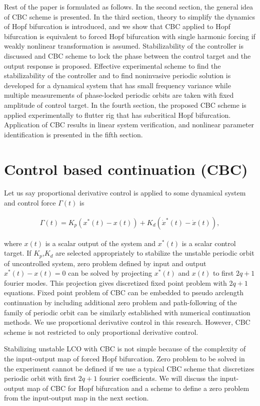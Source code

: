 \documentclass[openacc]{rsproca_new}%
\begin{document}
Rest of the paper is formulated as follows. In the second section, the general idea of CBC scheme is presented. In the third section, theory to simplify the dynamics of Hopf bifurcation is introduced, and we show that CBC applied to Hopf bifurcation is equivalent to forced Hopf bifurcation with single harmonic forcing if weakly nonlinear transformation is assumed. Stabilizability of the controller is discussed and CBC scheme to lock the phase between the control target and the output response is proposed. Effective experimental scheme to find the stabilizability of the controller and to find noninvasive periodic solution is developed for a dynamical system that has small frequency variance while multiple measurements of phase-locked periodic orbits are taken with fixed amplitude of control target. In the fourth section, the proposed CBC scheme is applied experimentally to flutter rig that has subcritical Hopf bifurcation. Application of CBC results in linear system verification, and nonlinear parameter identification is presented in the fifth section.


\section{Control based continuation (CBC)}\label{CBC}
Let us say proportional derivative control is applied to some dynamical system and control force $\Gamma(t)$ is

\begin{align}
\Gamma(t)=K_p(x^*(t)-x(t))+K_d(\dot x^*(t)-\dot x(t)),
\end{align}

\noindent where $x(t)$ is a scalar output of the system and $x^*(t)$ is a scalar control target. If $K_p$,$K_d$ are selected appropriately to stabilize the unstable periodic orbit of uncontrolled system, zero problem defined by input and output $x^*(t)-x(t)=0$ can be solved by projecting $x^*(t)$ and $x(t)$ to first $2q+1$ fourier modes. This projection gives discretized fixed point problem with $2q+1$ equations. Fixed point problem of CBC can be embedded to pseudo arclength continuation by including additional zero problem and path-following of the family of periodic orbit can be similarly established with numerical continuation methods. We use proportional derivative control in this research. However, CBC scheme is not restricted to only proportional derivative control.

Stabilizing unstable LCO with CBC is not simple because of the complexity of the input-output map of forced Hopf bifurcation. Zero problem to be solved in the experiment cannot be defined if we use a typical CBC scheme that discretizes periodic orbit with first $2q+1$ fourier coefficients. We will discuss the input-output map of CBC for Hopf bifurcation and a scheme to define a zero problem from the input-output map in the next section.
\end{document}
